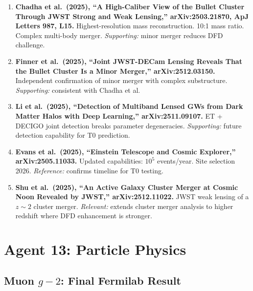 \documentclass[11pt]{article}
\begin{document}
\begin{tcolorbox}[colback=green!5!white, colframe=green!50!black,
  title=\textbf{Agent 5: NEW LITERATURE REVIEWED}]

\begin{enumerate}

\item \textbf{Chadha et al.\ (2025), ``A High-Caliber View of the
  Bullet Cluster Through JWST Strong and Weak Lensing,''
  arXiv:2503.21870, ApJ Letters 987, L15.}
  Highest-resolution mass reconstruction. 10:1 mass ratio. Complex
  multi-body merger. \emph{Supporting:} minor merger reduces DFD
  challenge.

\item \textbf{Finner et al.\ (2025), ``Joint JWST-DECam Lensing
  Reveals That the Bullet Cluster Is a Minor Merger,''
  arXiv:2512.03150.}
  Independent confirmation of minor merger with complex substructure.
  \emph{Supporting:} consistent with Chadha et al.

\item \textbf{Li et al.\ (2025), ``Detection of Multiband Lensed GWs
  from Dark Matter Halos with Deep Learning,'' arXiv:2511.09107.}
  ET + DECIGO joint detection breaks parameter degeneracies.
  \emph{Supporting:} future detection capability for T0 prediction.

\item \textbf{Evans et al.\ (2025), ``Einstein Telescope and Cosmic
  Explorer,'' arXiv:2505.11033.}
  Updated capabilities: $10^5$ events/year. Site selection 2026.
  \emph{Reference:} confirms timeline for T0 testing.

\item \textbf{Shu et al.\ (2025), ``An Active Galaxy Cluster Merger
  at Cosmic Noon Revealed by JWST,'' arXiv:2512.11022.}
  JWST weak lensing of a $z \sim 2$ cluster merger. \emph{Relevant:}
  extends cluster merger analysis to higher redshift where DFD
  enhancement is stronger.

\end{enumerate}
\end{tcolorbox}

\section{Agent 13: Particle Physics}

\subsection{Muon $g-2$: Final Fermilab Result}
\end{document}
